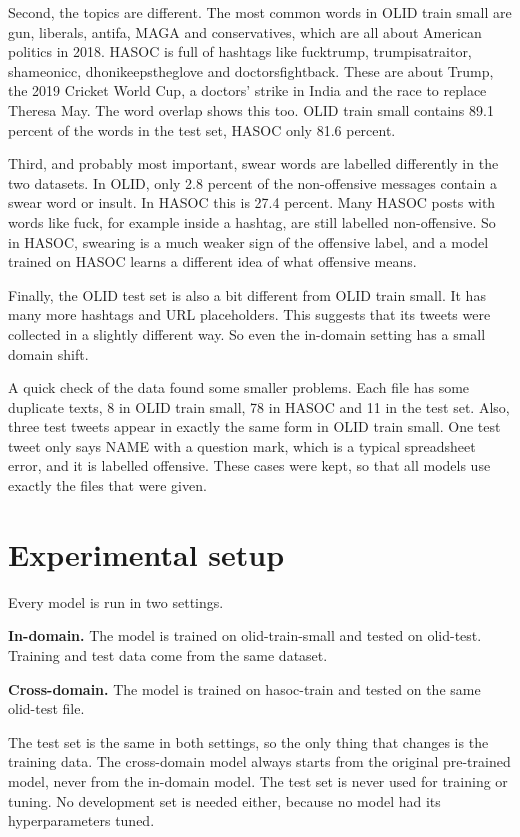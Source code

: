 \documentclass[11pt,a4paper]{article}
\begin{document}
Second, the topics are different. The most common words in OLID train small are gun, liberals, antifa, MAGA and conservatives, which are all about American politics in 2018. HASOC is full of hashtags like fucktrump, trumpisatraitor, shameonicc, dhonikeepstheglove and doctorsfightback. These are about Trump, the 2019 Cricket World Cup, a doctors' strike in India and the race to replace Theresa May. The word overlap shows this too. OLID train small contains 89.1 percent of the words in the test set, HASOC only 81.6 percent.

Third, and probably most important, swear words are labelled differently in the two datasets. In OLID, only 2.8 percent of the non-offensive messages contain a swear word or insult. In HASOC this is 27.4 percent. Many HASOC posts with words like fuck, for example inside a hashtag, are still labelled non-offensive. So in HASOC, swearing is a much weaker sign of the offensive label, and a model trained on HASOC learns a different idea of what offensive means.

Finally, the OLID test set is also a bit different from OLID train small. It has many more hashtags and URL placeholders. This suggests that its tweets were collected in a slightly different way. So even the in-domain setting has a small domain shift.

A quick check of the data found some smaller problems. Each file has some duplicate texts, 8 in OLID train small, 78 in HASOC and 11 in the test set. Also, three test tweets appear in exactly the same form in OLID train small. One test tweet only says NAME with a question mark, which is a typical spreadsheet error, and it is labelled offensive. These cases were kept, so that all models use exactly the files that were given.

\section{Experimental setup}

Every model is run in two settings.

\textbf{In-domain.} The model is trained on olid-train-small and tested on olid-test. Training and test data come from the same dataset.

\textbf{Cross-domain.} The model is trained on hasoc-train and tested on the same olid-test file.

The test set is the same in both settings, so the only thing that changes is the training data. The cross-domain model always starts from the original pre-trained model, never from the in-domain model. The test set is never used for training or tuning. No development set is needed either, because no model had its hyperparameters tuned.
\end{document}
